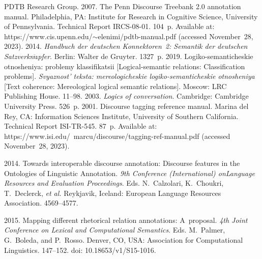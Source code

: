 \begin{multicols}{2}
{{\begin{thebibliography}{99}
PDTB Research Group. 2007. The Penn Discourse Treebank 2.0 annotation manual. Philadelphia, 
PA: Institute for Research in Cognitive Science, University of Pennsylvania. Technical Report 
IRCS-08-01. 104~p. Available at: {\sf https://www.cis.upenn.edu/$\sim$elenimi/pdtb-manual.pdf} 
(accessed November~28, 2023).
 2014. \textit{Handbuch der 
deutschen Konnektoren~2: Semantik der deutschen Satzverkn$\ddot{\mbox{u}}$pfer}. Berlin: Walter de Gruyter. 
1327~p.
 2019. Logiko-semanticheskie otnosheniya: problemy klassifikatsii  
[Logical-semantic relations: Classification problems]. \textit{Svyaznost' teksta: mereologicheskie 
logiko-semanticheskie otnosheniya} [Text coherence: Mereological logical semantic relations]. 
Moscow: LRC Publishing House. 11--98.
 2003. \textit{Logics of conversation}. Cambridge: Cambridge 
University Press. 526~p.
 2001. Discourse tagging reference manual.  Marina del Rey, CA: Information Sciences Institute, University of Southern 
California. Technical Report 
ISI-TR-545.  87~p. Available at: {\sf https://www.isi.edu/~marcu/discourse/tagging-ref-manual.pdf} 
(accessed November~28, 2023).

 2014. Towards interoperable discourse annotation: Discourse features in the 
Ontologies of Linguistic Annotation. \textit{9th Conference (International) on\linebreak Language Resources 
and Evaluation Proceedings}. Eds. N.~Calzolari, K.~Choukri, T.~Declerck, \textit{et al.} Reykjavik, Iceland: 
European Language Resources Association. 4569--4577.
{ %

}

 2015. Mapping different rhetorical relation annotations: 
A~proposal. \textit{4th Joint Conference on Lexical and Computational Semantics}. Eds. 
M.~Palmer, G.~Boleda, and P.~Rosso. Denver, CO, USA: Association for Computational 
Linguistics. 147--152. doi: 10.18653/v1/S15-1016.


\end{thebibliography}}}
\end{multicols}
